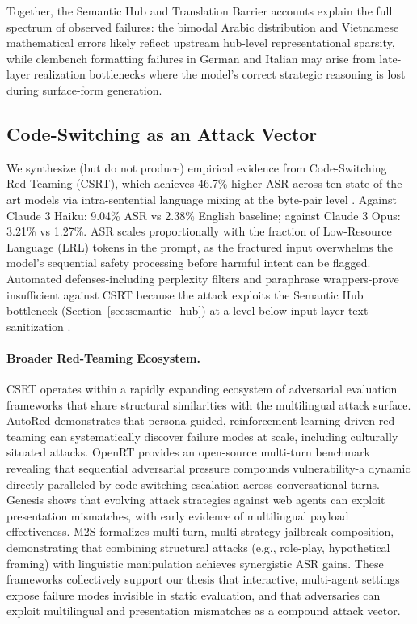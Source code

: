 \documentclass[11pt]{article}
\begin{document}
Together, the Semantic Hub and Translation Barrier accounts explain the full spectrum of observed failures: the bimodal Arabic distribution and Vietnamese mathematical errors likely reflect upstream hub-level representational sparsity, while clembench formatting failures in German and Italian may arise from late-layer realization bottlenecks where the model's correct strategic reasoning is lost during surface-form generation.

\subsection{Code-Switching as an Attack Vector}
\label{sec:codeswitching}

We synthesize (but do not produce) empirical evidence from Code-Switching Red-Teaming (CSRT), which achieves 46.7\% higher ASR across ten state-of-the-art models via intra-sentential language mixing at the byte-pair level \citep{yoo2025csrt}. Against Claude 3 Haiku: 9.04\% ASR vs 2.38\% English baseline; against Claude 3 Opus: 3.21\% vs 1.27\%. ASR scales proportionally with the fraction of Low-Resource Language (LRL) tokens in the prompt, as the fractured input overwhelms the model's sequential safety processing before harmful intent can be flagged. Automated defenses-including perplexity filters and paraphrase wrappers-prove insufficient against CSRT because the attack exploits the Semantic Hub bottleneck (Section~\ref{sec:semantic_hub}) at a level below input-layer text sanitization \citep{yoo2025csrt}.

\paragraph{Broader Red-Teaming Ecosystem.} CSRT operates within a rapidly expanding ecosystem of adversarial evaluation frameworks that share structural similarities with the multilingual attack surface. AutoRed \citep{diao2025autored} demonstrates that persona-guided, reinforcement-learning-driven red-teaming can systematically discover failure modes at scale, including culturally situated attacks. OpenRT \citep{wang2026openrt} provides an open-source multi-turn benchmark revealing that sequential adversarial pressure compounds vulnerability-a dynamic directly paralleled by code-switching escalation across conversational turns. Genesis \citep{zhang2025genesis} shows that evolving attack strategies against web agents can exploit presentation mismatches, with early evidence of multilingual payload effectiveness. M2S \citep{li2025m2s} formalizes multi-turn, multi-strategy jailbreak composition, demonstrating that combining structural attacks (e.g., role-play, hypothetical framing) with linguistic manipulation achieves synergistic ASR gains. These frameworks collectively support our thesis that interactive, multi-agent settings expose failure modes invisible in static evaluation, and that adversaries can exploit multilingual and presentation mismatches as a compound attack vector.
\end{document}
